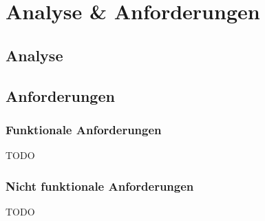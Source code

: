 
\chapter{Analyse \& Anforderungen}
\section{Analyse}


\section{Anforderungen}
\subsection{Funktionale Anforderungen}
\begin{flushleft}
TODO
\end{flushleft}
\subsection{Nicht funktionale Anforderungen}
\begin{flushleft}
TODO
\end{flushleft}